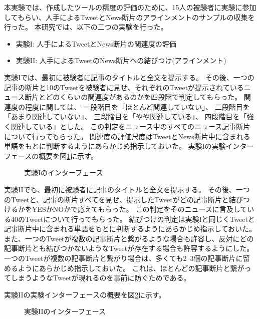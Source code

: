 \documentclass[12pt]{jarticle}
\begin{document}
本実験では、作成したツールの精度の評価のために、15人の被験者に実験に参加してもらい、人手によるTweetとNews断片のアラインメントのサンプルの収集を行った。
本研究では、以下の二つの実験を行った。
\begin{itemize}
  \item 実験I: 人手によるTweetとNews断片の関連度の評価
  \item 実験II: 人手によるTweetのNews断片への結びつけ(アラインメント)
\end{itemize}

実験Iでは、最初に被験者に記事のタイトルと全文を提示する。
その後、一つの記事の断片と10のTweetを被験者に見せ、それぞれのTweetが提示されているニュース断片とどのくらいの関連度があるのかを四段階で判定してもらった。
関連度の程度に関しては、
一段階目を「ほとんど関連していない」、
二段階目を「あまり関連していない」、
三段階目を「やや関連している」、
四段階目を「強く関連している」とした。
この判定をニュース中のすべてのニュース記事断片について行ってもらった。
関連度の評価尺度はTweetとNews断片中に含まれる単語をもとに判断するようにあらかじめ指示しておいた。
実験Iの実験インターフェースの概要を図\ref{annotation_by_human_A}に示す。

\begin{figure}[t]
  \begin{center}
  \end{center}
  \label{annotation_by_human_A}
  \caption{実験Iのインターフェース}
\end{figure}

実験IIでも、最初に被験者に記事のタイトルと全文を提示する。
その後、一つのTweetと、記事の断片すべてを見せ、提示したTweetがどの記事断片と結びつけるかをYESかNOかで応えてもらった。
この判定をそのニュースに言及している40のTweetについて行ってもらった。
結びつけの判定は実験Iと同じくTweetと記事断片中に含まれる単語をもとに判断するようにあらかじめ指示しておいた。
また、一つのTweetが複数の記事断片と繋がるような場合も許容し、反対にどの記事断片とも結びつかないようなTweetが存在する場合も許容するようにした。
一つのTweetが複数の記事断片と繋がり場合は、多くても2~3個の記事断片に留めるようにあらかじめ指示しておいた。
これは、ほとんどの記事断片と繋がってしまうようなTweetが現れるのを事前に防ぐためである。

実験IIの実験インターフェースの概要を図\ref{annotation_by_human_B}に示す。

\begin{figure}[t]
  \begin{center}
  \end{center}
  \label{annotation_by_human_B}
  \caption{実験IIのインターフェース}
\end{figure}
\end{document}
